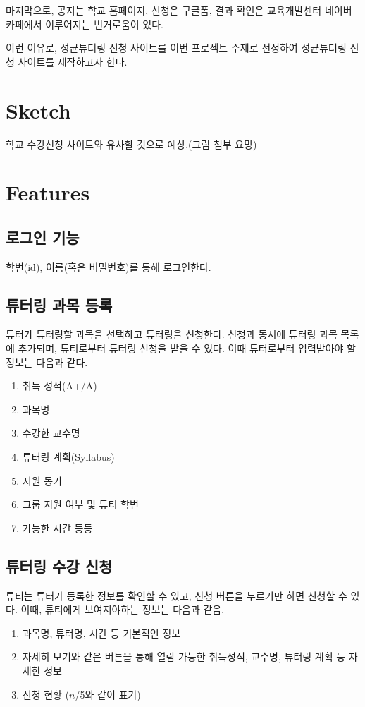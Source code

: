 \documentclass{lxaiproposal}
\begin{document}
마지막으로, 공지는 학교 홈페이지, 신청은 구글폼, 결과 확인은 교육개발센터 네이버 카페에서 이루어지는 번거로움이 있다.

이런 이유로, 성균튜터링 신청 사이트를 이번 프로젝트 주제로 선정하여 성균튜터링 신청 사이트를 제작하고자 한다.

\section{Sketch}
\vspace*{-3mm}
학교 수강신청 사이트와 유사할 것으로 예상.(그림 첨부 요망)

\section{Features}
\vspace*{-3mm}

\subsection{로그인 기능}
학번(id), 이름(혹은 비밀번호)를 통해 로그인한다.

\subsection{튜터링 과목 등록}
튜터가 튜터링할 과목을 선택하고 튜터링을 신청한다. 신청과 동시에 튜터링 과목 목록에 추가되며, 튜티로부터 튜터링 신청을 받을 수 있다.
이때 튜터로부터 입력받아야 할 정보는 다음과 같다.
\begin{enumerate}
    \item 취득 성적(A+/A)
    \item 과목명
    \item 수강한 교수명
    \item 튜터링 계획(Syllabus)
    \item 지원 동기
    \item 그룹 지원 여부 및 튜티 학번
    \item 가능한 시간 등등
\end{enumerate}

\subsection{튜터링 수강 신청}
튜티는 튜터가 등록한 정보를 확인할 수 있고, 신청 버튼을 누르기만 하면 신청할 수 있다.
이때, 튜티에게 보여져야하는 정보는 다음과 같음.
\begin{enumerate}
    \item 과목명, 튜터명, 시간 등 기본적인 정보
    \item 자세히 보기와 같은 버튼을 통해 열람 가능한 취득성적, 교수명, 튜터링 계획 등 자세한 정보
    \item 신청 현황 ($n$/5와 같이 표기)
\end{enumerate}
\end{document}
